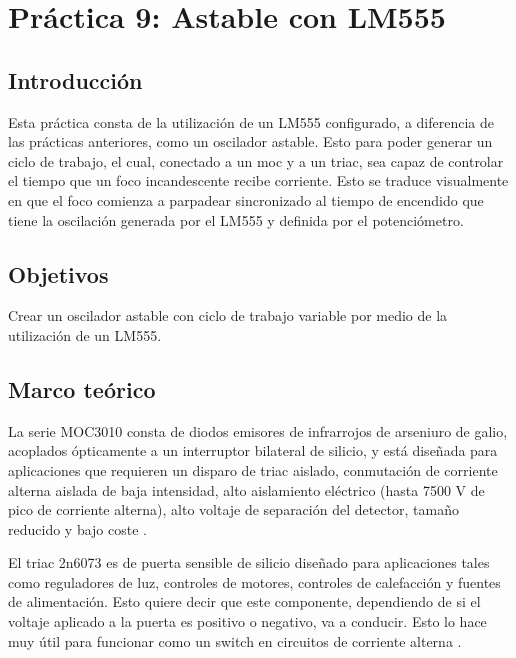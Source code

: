 \clearpage

\section{Práctica 9: Astable con LM555}

\subsection{Introducción}

Esta práctica consta de la utilización de un LM555 configurado, a diferencia de las prácticas anteriores, como un oscilador astable. Esto para poder generar un ciclo de trabajo, el cual, conectado a un moc y a un triac, sea capaz de controlar el tiempo que un foco incandescente recibe corriente. Esto se traduce visualmente en que el foco comienza a parpadear sincronizado al tiempo de encendido que tiene la oscilación generada por el LM555 y definida por el potenciómetro.

\subsection{Objetivos}

Crear un oscilador astable con ciclo de trabajo variable por medio de la utilización de un LM555.

\subsection{Marco teórico}

La serie MOC3010 consta de diodos emisores de infrarrojos de arseniuro de galio, acoplados ópticamente a un interruptor bilateral de silicio, y está diseñada para aplicaciones que requieren un disparo de triac aislado, conmutación de corriente alterna aislada de baja intensidad, alto aislamiento eléctrico (hasta 7500 V de pico de corriente alterna), alto voltaje de separación del detector, tamaño reducido y bajo coste \parencite{motorola_moc3011_nodate}.

El triac 2n6073 es de puerta sensible de silicio diseñado para aplicaciones tales como reguladores de luz, controles de motores, controles de calefacción y fuentes de alimentación. Esto quiere decir que este componente, dependiendo de si el voltaje aplicado a la puerta es positivo o negativo, va a conducir. Esto lo hace muy útil para funcionar como un switch en circuitos de corriente alterna \parencite{central_semiconductor_corp_2n6073_nodate}.

